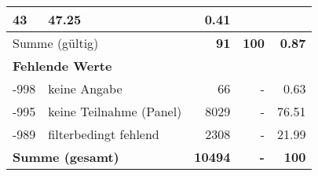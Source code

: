 \begin{longtable}{lXrrr}
       \num{43} &
       \num[round-mode=places,round-precision=2]{47.25} &
         \num[round-mode=places,round-precision=2]{0.41} \\
     \midrule
     \multicolumn{2}{l}{Summe (gültig)} &
       \textbf{\num{91}} &
     \textbf{\num{100}} &
       \textbf{\num[round-mode=places,round-precision=2]{0.87}} \\
     \multicolumn{5}{l}{\textbf{Fehlende Werte}}\\
       -998 &
       keine Angabe &
         \num{66} &
        - &
         \num[round-mode=places,round-precision=2]{0.63} \\
       -995 &
       keine Teilnahme (Panel) &
         \num{8029} &
        - &
         \num[round-mode=places,round-precision=2]{76.51} \\
       -989 &
       filterbedingt fehlend &
         \num{2308} &
        - &
         \num[round-mode=places,round-precision=2]{21.99} \\
     \midrule
     \multicolumn{2}{l}{\textbf{Summe (gesamt)}} &
          \textbf{\num{10494}} &
        \textbf{-} &
        \textbf{\num{100}} \\
     \bottomrule
     \end{longtable}
     
